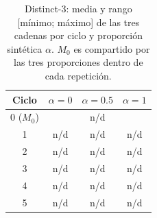 
\begin{table}[ht]
\centering
\footnotesize
\begin{tabular}{c c c c}
\hline
Ciclo & $\alpha=0$ & $\alpha=0.5$ & $\alpha=1$ \\
\hline
0 ($M_0$) & \multicolumn{3}{c}{n/d} \\
1 & n/d & n/d & n/d \\
2 & n/d & n/d & n/d \\
3 & n/d & n/d & n/d \\
4 & n/d & n/d & n/d \\
5 & n/d & n/d & n/d \\
\hline
\end{tabular}
\caption{Distinct-3: media y rango [mínimo; máximo] de las tres cadenas por ciclo y proporción sintética $\alpha$. $M_0$ es compartido por las tres proporciones dentro de cada repetición.}
\label{tab:medias_distinct_3}
\end{table}
